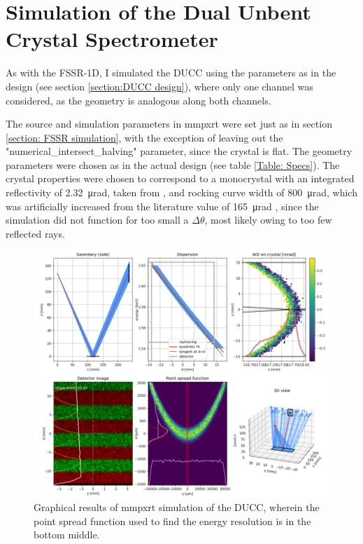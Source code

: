 \section{Simulation of the Dual Unbent Crystal 
Spectrometer}
\label{section: DUCC Simulation}
As with the FSSR-1D, I simulated the DUCC using the 
parameters as 
in the design (see section \ref{section:DUCC 
design}), where only one 
channel was 
considered, as the geometry is analogous along both channels. 

The source and simulation parameters in mmpxrt were set just as 
in section \ref{section: FSSR simulation}, 
with the exception of leaving out the 
"numerical\_intersect\_halving" parameter, 
since the crystal is flat. The geometry parameters were chosen 
as in the actual 
design (see table \ref{Table: Specs}). The crystal 
properties were chosen to 
correspond to a 
monocrystal with an integrated 
reflectivity 
of \SI{2.32}{\micro\radian}, taken from 
\citep{ferrari2019characterization}, and 
rocking curve width of \SI{800}{\micro\radian}, which 
was artificially increased from the literature value 
of 
\SI{165}{\micro\radian} \citep{rajesh2015growth}, since the 
simulation did not 
function for too small a $\Delta \theta$, most likely owing to 
too few 
reflected rays.


\begin{figure}[H]
	\centering
	\includegraphics[width=\textwidth]{Diagrams/DUCCmmpxrtGraphs.PNG}
	\caption{Graphical results of mmpxrt simulation 
	of the DUCC, wherein the point 
		spread function used to find the energy 
		resolution is in the bottom middle.}
	\label{mmpxrtDUCCGraphs}
\end{figure}

